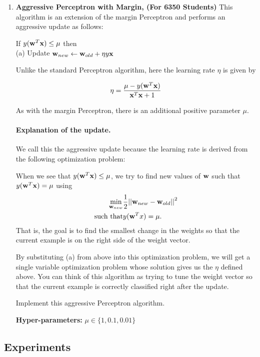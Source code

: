 \begin{enumerate}
\item {\bf Aggressive Perceptron with Margin, (For 6350 Students)}
  This algorithm is an extension of the margin Perceptron and performs
  an aggressive update as follows:

  If $y({\bf w}^T {\bf x}) \leq \mu$ then  \\
  \null\quad\quad (a) Update ${\bf w}_{new} \leftarrow {\bf w}_{old} + \eta y{\bf x}$


  Unlike the standard Perceptron algorithm, here the learning
  rate $\eta$ is given by

  \begin{align*}
    \eta = \frac{\mu - y({\bf w}^T {\bf x}) }{{\bf x}^T {\bf x} +1}
  \end{align*}

  As with the margin Perceptron, there is an additional positive parameter $\mu$.

  \paragraph{Explanation of the update.} We call this the aggressive update because the learning rate is derived from the following optimization problem:

  When we see that $y({\bf w}^T {\bf x}) \leq \mu$, we try to find new values of ${\bf w}$ such that $y({\bf w}^T {\bf x}) = \mu$ using
  \begin{eqnarray*}
    \min_{{\bf w}_{new}} &     \frac{1}{2} {||\textbf{${\bf w}_{new}$} - \textbf{${\bf w}_{old}$}||}^2\\
    \mbox{such that} & y({\bf w}^T x) = \mu.
  \end{eqnarray*}
  That is, the goal is to find the smallest change in the weights so that the current example is on the right side of the weight vector.

  By substituting (a) from above into this optimization problem, we will get a single variable optimization problem whose solution gives us the $\eta$ defined above. You can think of this algorithm as trying to tune the weight vector so that the current example is correctly classified right after the update.

  Implement this aggressive Perceptron algorithm.

  \textbf{Hyper-parameters:} $\mu\in\{1,0.1,0.01\}$

\end{enumerate}


\subsection{Experiments}


